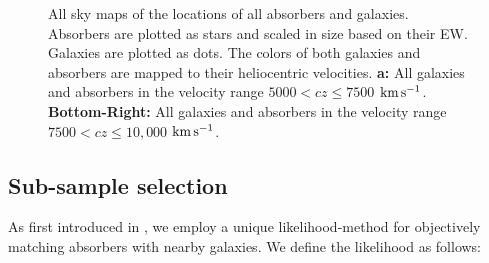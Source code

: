 \documentclass[twocolumn,tighten]{aastex62}
\newcommand{\kms}{$\rm km\, s^{-1}$}
\begin{document}
\begin{figure}
\centering
  \caption{\small{All sky maps of the locations of all absorbers and galaxies. Absorbers are plotted as stars and scaled in size based on their EW. Galaxies are plotted as dots. The colors of both galaxies and absorbers are mapped to their heliocentric velocities. \textbf{a:} All galaxies and absorbers in the velocity range $5000 < cz \leq 7500$ \kms. \textbf{Bottom-Right:} All galaxies and absorbers in the velocity range $7500 < cz \leq 10,000$ \kms.}}
\vspace{0pt}
\end{figure}




\subsection{Sub-sample selection}
As first introduced in \cite{french2017}, we employ a unique likelihood-method for objectively matching absorbers with nearby galaxies. We define the likelihood as follows: 
\end{document}

